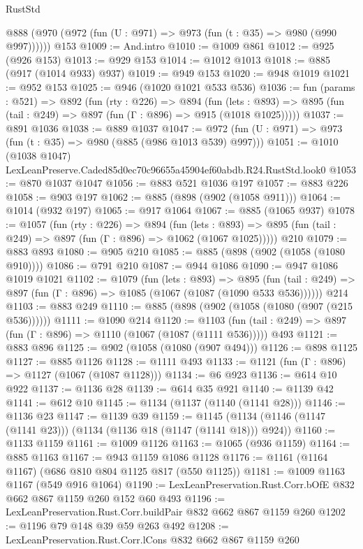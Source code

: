 \begin{lexlean}{RustStd}
\begin{coremodule}
    @888 (@970 (@972 (fun (U : @971) => @973 (fun (t : @35) => @980 (@990 @997))))))
    @153
@1009 := And.intro
@1010 := @1009 @861
@1012 := @925 (@926 @153)
@1013 := @929 @153
@1014 := @1012 @1013
@1018 := @885 (@917 (@1014 @933) @937)
@1019 := @949 @153
@1020 := @948 @1019
@1021 := @952 @153
@1025 := @946 (@1020 @1021 @533 @536)
@1036 := fun (params : @521) =>
  @892
    (fun (rty : @226) =>
    @894
      (fun (lets : @893) =>
      @895 (fun (tail : @249) => @897 (fun (Γ : @896) => @915 (@1018 @1025)))))
@1037 := @891 @1036
@1038 := @889 @1037
@1047 := @972 (fun (U : @971) => @973 (fun (t : @35) => @980 (@885 (@986 @1013 @539) @997)))
@1051 := @1010 (@1038 @1047) LexLeanPreserve.Caded85d0ec70c96655a45904ef60abdb.R24.RustStd.look0
@1053 := @870 @1037 @1047
@1056 := @883 @521 @1036 @197
@1057 := @883 @226
@1058 := @903 @197
@1062 := @885 (@898 (@902 (@1058 @911)))
@1064 := @1014 (@932 @197)
@1065 := @917 @1064
@1067 := @885 (@1065 @937)
@1078 := @1057
    (fun (rty : @226) =>
    @894
      (fun (lets : @893) =>
      @895 (fun (tail : @249) => @897 (fun (Γ : @896) => @1062 (@1067 @1025)))))
    @210
@1079 := @883 @893
@1080 := @905 @210
@1085 := @885 (@898 (@902 (@1058 (@1080 @910))))
@1086 := @791 @210
@1087 := @944 @1086
@1090 := @947 @1086 @1019 @1021
@1102 := @1079
    (fun (lets : @893) =>
    @895 (fun (tail : @249) => @897 (fun (Γ : @896) => @1085 (@1067 (@1087 (@1090 @533 @536))))))
    @214
@1103 := @883 @249
@1110 := @885 (@898 (@902 (@1058 (@1080 (@907 (@215 @536))))))
@1111 := @1090 @214
@1120 := @1103
    (fun (tail : @249) => @897 (fun (Γ : @896) => @1110 (@1067 (@1087 (@1111 @536)))))
    @493
@1121 := @883 @896
@1125 := @902 (@1058 (@1080 (@907 @494)))
@1126 := @898 @1125
@1127 := @885 @1126
@1128 := @1111 @493
@1133 := @1121 (fun (Γ : @896) => @1127 (@1067 (@1087 @1128)))
@1134 := @6 @923
@1136 := @614 @10 @922
@1137 := @1136 @28
@1139 := @614 @35 @921
@1140 := @1139 @42
@1141 := @612 @10
@1145 := @1134 (@1137 (@1140 (@1141 @28)))
@1146 := @1136 @23
@1147 := @1139 @39
@1159 := @1145 (@1134 (@1146 (@1147 (@1141 @23))) (@1134 (@1136 @18 (@1147 (@1141 @18))) @924))
@1160 := @1133 @1159
@1161 := @1009 @1126
@1163 := @1065 (@936 @1159)
@1164 := @885 @1163
@1167 := @943 @1159 @1086 @1128
@1176 := @1161 (@1164 @1167) (@686 @810 @804 @1125 @817 (@550 @1125))
@1181 := @1009 @1163 @1167 (@549 @916 @1064)
@1190 := LexLeanPreservation.Rust.Corr.bOfE @832 @662 @867 @1159 @260 @152 @60 @493
@1196 := LexLeanPreservation.Rust.Corr.buildPair @832 @662 @867 @1159 @260
@1202 := @1196 @79 @148 @39 @59 @263 @492
@1208 := LexLeanPreservation.Rust.Corr.lCons @832 @662 @867 @1159 @260

\end{coremodule}
\end{lexlean}
